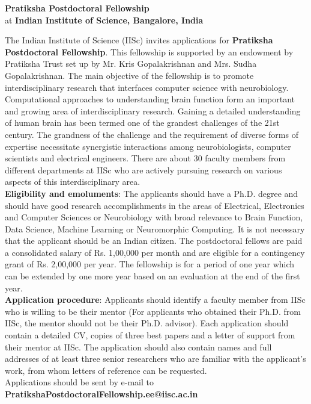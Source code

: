 \documentclass[12pt]{article}
\begin{document}
\begin{large}
\begin{center}
{\bf Pratiksha Postdoctoral Fellowship}\\
at {\bf Indian Institute of Science, Bangalore, India}
\end{center}
\end{large}


\vspace*{0.75cm}
\noindent
The Indian Institute of Science (IISc) invites applications for {\bf Pratiksha Postdoctoral Fellowship}. This fellowship is supported by an endowment by Pratiksha Trust set up by Mr. Kris Gopalakrishnan and Mrs. Sudha Gopalakrishnan. The main objective of the fellowship is to promote interdisciplinary research that  interfaces computer science with neurobiology.  \\

\noindent
Computational approaches to understanding brain function form an important and growing area of interdisciplinary research. Gaining a detailed understanding of human brain has been termed one of the grandest challenges of the 21st century. The grandness of the challenge and the requirement of diverse forms of expertise necessitate synergistic interactions among neurobiologists, computer scientists and electrical engineers. There are about 30 faculty members from different departments at IISc who are actively pursuing research on various aspects of this interdisciplinary area. \\



\noindent
{\bf Eligibility and emoluments}: The applicants should have a Ph.D. degree and should have good research accomplishments in the areas of Electrical, Electronics and Computer Sciences or Neurobiology with broad relevance to Brain Function, Data Science, Machine Learning or Neuromorphic Computing. It is not necessary that the applicant should be an Indian citizen. The postdoctoral fellows are paid a consolidated salary of Rs. 1,00,000 per month and are eligible for a contingency grant of Rs. 2,00,000 per year. The fellowship is for a period of one year which can be extended by one more year based on an evaluation at the end of the first year. \\

\noindent
{\bf Application procedure}: Applicants should identify a faculty member from IISc who is willing to be their mentor (For applicants who obtained their Ph.D. from IISc, the mentor should not be their Ph.D. advisor). Each application should contain a detailed CV, copies of three best papers and a letter of support from their mentor at IISc. The application should also contain names and full addresses of at least three senior researchers who are familiar with the applicant's work, from whom letters of reference can be requested. \\

\noindent
Applications should be sent by e-mail to \\
{\bf PratikshaPostdoctoralFellowship.ee@iisc.ac.in}
\end{document}
